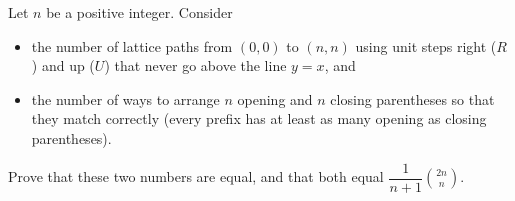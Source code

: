 Let $n$ be a positive integer. Consider
\begin{itemize}
\item the number of lattice paths from $(0,0)$ to $(n,n)$ using unit steps right ($R$) and up ($U$) that never go above the line $y=x$, and
\item the number of ways to arrange $n$ opening and $n$ closing parentheses so that they match correctly (every prefix has at least as many opening as closing parentheses).
\end{itemize}
Prove that these two numbers are equal, and that both equal $\dfrac1{n+1}\binom{2n}{n}$.
